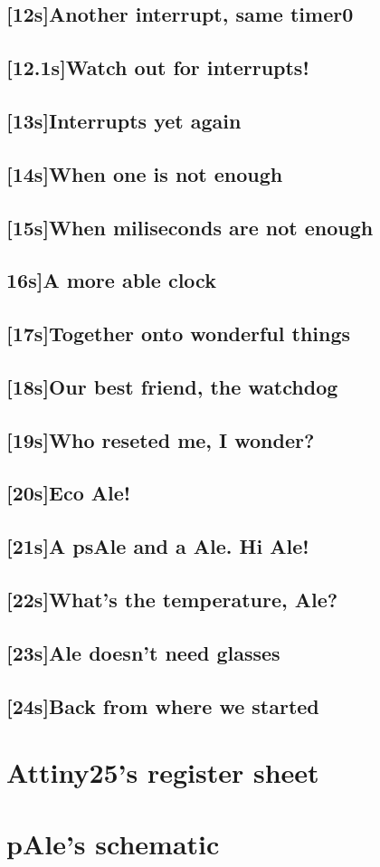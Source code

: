 \documentclass[12pt, a4paper]{book}
\begin{document}
\subsection{[12s]Another interrupt, same timer0}
\subsection{[12.1s]Watch out for interrupts!}
\subsection{[13s]Interrupts yet again}
\subsection{[14s]When one is not enough} %
\newenvironment{PseudoCode}{%
\begin{lstlisting}[numbers=left, framexleftmargin=5mm, frame=shadowbox, rulesepcolor=\color{blue}]}{%
\end{lstlisting}}
\subsection{[15s]When miliseconds are not enough}
\subsection{16s]A more able clock}
\subsection{[17s]Together onto wonderful things}
\subsection{[18s]Our best friend, the watchdog}
\subsection{[19s]Who reseted me, I wonder?}
\subsection{[20s]Eco Ale!}
\subsection{[21s]A psAle and a Ale. Hi Ale!}
\subsection{[22s]What's the temperature, Ale?}
\subsection{[23s]Ale doesn't need glasses}
\subsection{[24s]Back from where we started}
\section{Attiny25's register sheet}
\section{pAle's schematic}
\end{document}
